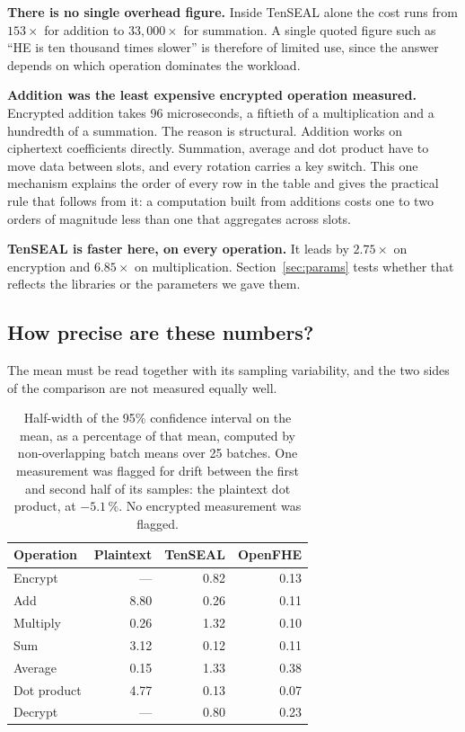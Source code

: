 \documentclass[11pt,a4paper]{article}
\begin{document}
\textbf{There is no single overhead figure.} Inside TenSEAL alone the cost runs from
$153\times$ for addition to $33{,}000\times$ for summation. A single quoted figure
such as ``HE is ten thousand times slower'' is therefore of limited use, since the
answer depends on which operation dominates the workload.

\textbf{Addition was the least expensive encrypted operation measured.} Encrypted
addition takes 96 microseconds, a fiftieth of a multiplication and a hundredth of a
summation. The reason is structural. Addition works on ciphertext coefficients
directly. Summation, average and dot product have to move data between slots, and
every rotation carries a key switch. This one mechanism explains the order of every
row in the table and gives the practical rule that follows from it: a computation
built from additions costs one to two orders of magnitude less than one that
aggregates across slots.

\textbf{TenSEAL is faster here, on every operation.} It leads by $2.75\times$ on
encryption and $6.85\times$ on multiplication. Section~\ref{sec:params} tests whether
that reflects the libraries or the parameters we gave them.

\subsection{How precise are these numbers?}\label{sec:precision}

The mean must be read together with its sampling variability, and the two sides of the
comparison are not measured equally well.

\begin{table}[H]\centering\small
\begin{tabular}{@{}lrrr@{}}
\toprule
\textbf{Operation} & \textbf{Plaintext} & \textbf{TenSEAL} & \textbf{OpenFHE} \\
\midrule
Encrypt     & ---    & 0.82 & 0.13 \\
Add         & 8.80   & 0.26 & 0.11 \\
Multiply    & 0.26   & 1.32 & 0.10 \\
Sum         & 3.12   & 0.12 & 0.11 \\
Average     & 0.15   & 1.33 & 0.38 \\
Dot product & 4.77   & 0.13 & 0.07 \\
Decrypt     & ---    & 0.80 & 0.23 \\
\bottomrule
\end{tabular}
\caption{Half-width of the 95\% confidence interval on the mean, as a percentage of
that mean, computed by non-overlapping batch means over 25 batches. One measurement
was flagged for drift between the first and second half of its samples: the
plaintext dot product, at $-5.1\,\%$. No encrypted measurement was flagged.}
\end{table}
\end{document}

